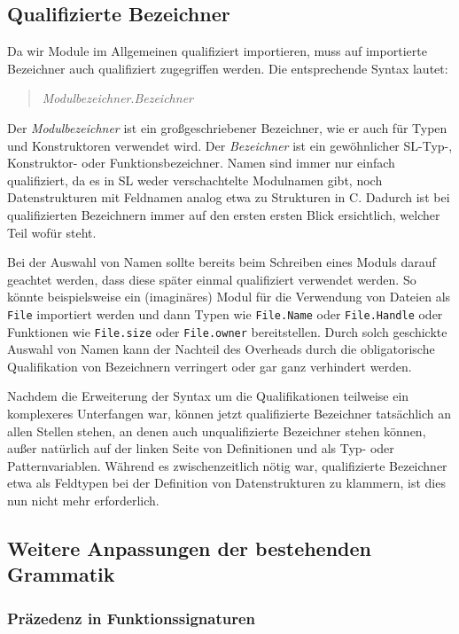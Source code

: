 \documentclass[runningheads]{llncs}
\begin{document}
\subsection{Qualifizierte Bezeichner}
Da wir Module im Allgemeinen qualifiziert importieren, muss auf
importierte Bezeichner auch qualifiziert zugegriffen werden. Die
entsprechende Syntax lautet:

\begin{quote}
\emph{Modulbezeichner}.\emph{Bezeichner}
\end{quote}

Der \emph{Modulbezeichner} ist ein großgeschriebener Bezeichner, wie
er auch für Typen und Konstruktoren verwendet wird.  Der
\emph{Bezeichner} ist ein gewöhnlicher SL-Typ-, Konstruktor- oder
Funktionsbezeichner.  Namen sind immer nur einfach qualifiziert, da es
in SL weder verschachtelte Modulnamen gibt, noch Datenstrukturen mit
Feldnamen analog etwa zu Strukturen in C. Dadurch ist bei
qualifizierten Bezeichnern immer auf den ersten ersten Blick
ersichtlich, welcher Teil wofür steht.

Bei der Auswahl von Namen sollte bereits beim Schreiben eines Moduls
darauf geachtet werden, dass diese später einmal qualifiziert
verwendet werden.  So könnte beispielsweise ein (imaginäres) Modul für
die Verwendung von Dateien als \verb|File| importiert werden und dann
Typen wie \verb|File.Name| oder \verb|File.Handle| oder Funktionen wie
\verb|File.size| oder \verb|File.owner| bereitstellen.  Durch solch
geschickte Auswahl von Namen kann der Nachteil des Overheads durch die
obligatorische Qualifikation von Bezeichnern verringert oder gar ganz
verhindert werden.

Nachdem die Erweiterung der Syntax um die Qualifikationen teilweise
ein komplexeres Unterfangen war, können jetzt qualifizierte Bezeichner
tatsächlich an allen Stellen stehen, an denen auch unqualifizierte
Bezeichner stehen können, außer natürlich auf der linken Seite von
Definitionen und als Typ- oder Patternvariablen. Während es
zwischenzeitlich nötig war, qualifizierte Bezeichner etwa als
Feldtypen bei der Definition von Datenstrukturen zu klammern, ist dies
nun nicht mehr erforderlich.

\subsection{Weitere Anpassungen der bestehenden Grammatik}
\label{sec:syntaxAdjustments}

\subsubsection{Präzedenz in Funktionssignaturen}
\end{document}
